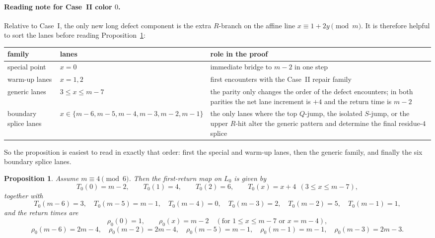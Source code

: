 \documentclass[11pt]{article}
\newtheorem{proposition}{Proposition}
\begin{document}
\paragraph{Reading note for Case~II color $0$.}
Relative to Case~I, the only new long defect component is the extra $R$-branch on the affine line $x\equiv 1+2y\pmod m$.
It is therefore helpful to sort the lanes before reading Proposition~\ref{prop:R0-caseII-data}:
\begin{center}
{\footnotesize
\renewcommand{\arraystretch}{1.15}
\begin{tabularx}{\textwidth}{@{}ll>{\raggedright\arraybackslash}X@{}}
\toprule
family & lanes & role in the proof \\
\midrule
special point & $x=0$ & immediate bridge to $m-2$ in one step \\
warm-up lanes & $x=1,2$ & first encounters with the Case~II repair family \\
generic lanes & $3\le x\le m-7$ & the parity only changes the order of the defect encounters; in both parities the net lane increment is $+4$ and the return time is $m-2$ \\
boundary splice lanes & $x\in\{m-6,m-5,m-4,m-3,m-2,m-1\}$ & the only lanes where the top $Q$-jump, the isolated $S$-jump, or the upper $R$-hit alter the generic pattern and determine the final residue-$4$ splice \\
\bottomrule
\end{tabularx}
}
\end{center}
So the proposition is easiest to read in exactly that order: first the special and warm-up lanes, then the generic family, and finally the six boundary splice lanes.

\begin{proposition}\label{prop:R0-caseII-data}
Assume $m\equiv 4\pmod 6$.
Then the first-return map on $L_0$ is given by
\[
T_0(0)=m-2,\qquad T_0(1)=4,\qquad T_0(2)=6,\qquad T_0(x)=x+4\ \ (3\le x\le m-7),
\]
together with
\[
T_0(m-6)=3,\quad T_0(m-5)=m-1,\quad T_0(m-4)=0,\quad T_0(m-3)=2,\quad T_0(m-2)=5,\quad T_0(m-1)=1,
\]
and the return times are
\[
\rho_0(0)=1,\qquad \rho_0(x)=m-2 \quad (\text{for } 1\le x\le m-7 \text{ or } x=m-4),
\]
\[
\rho_0(m-6)=2m-4,\quad \rho_0(m-2)=2m-4,\quad \rho_0(m-5)=m-1,\quad \rho_0(m-1)=m-1,\quad
\rho_0(m-3)=2m-3.
\]
\end{proposition}
\end{document}
